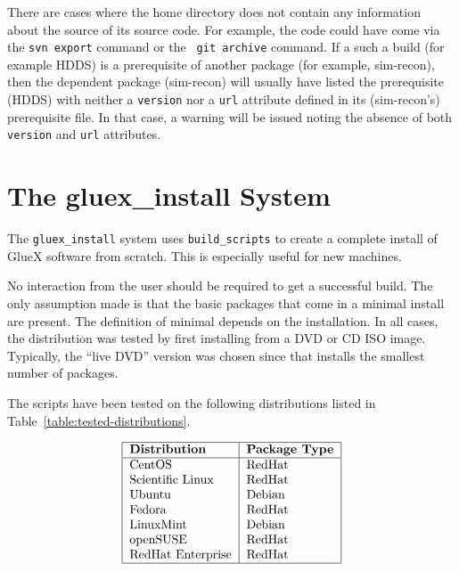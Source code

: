 \documentclass[12pt]{article}
\begin{document}
There are cases where the home directory does not contain any
information about the source of its source code. For example, the code
could have come via the {\tt svn\ export} command or the {\tt
  git\ archive} command. If a such a build (for example HDDS) is a
prerequisite of another package (for example, sim-recon), then the
dependent package (sim-recon) will usually have listed the
prerequisite (HDDS) with neither a {\tt version} nor a {\tt url}
attribute defined in its (sim-recon's) prerequisite file. In that
case, a warning will be issued noting the absence of both {\tt
  version} and {\tt url} attributes.

\section{The gluex\_install System}\label{gluex-install}

The {\tt gluex\_install} system uses {\tt build\_scripts} to create a
complete install of GlueX software from scratch. This is especially
useful for new machines.

No interaction from the user should be required to get a successful
build. The only assumption made is that the basic packages that come
in a minimal install are present. The definition of minimal
depends on the installation. In all cases, the distribution was tested
by first installing from a DVD or CD ISO image. Typically, the ``live
DVD'' version was chosen since that installs the smallest number of
packages.

The scripts have been tested on the following distributions listed in
Table~\ref{table:tested-distributions}.

\begin{table}
$$
\begin{tabular}{|l|l|}
\hline
\bf Distribution & \bf Package Type \\
\hline
CentOS & RedHat \\
Scientific Linux & RedHat \\
Ubuntu & Debian \\
Fedora & RedHat \\
LinuxMint & Debian \\
openSUSE & RedHat \\
RedHat Enterprise & RedHat \\
\hline
\end{tabular}
$$
\caption{Gluex\_install tested distributions.}\label{table:tested-distributions}
\end{table}
\end{document}
